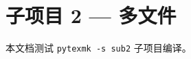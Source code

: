 \documentclass{article}
\begin{document}
\section{子项目 2 — 多文件}

本文档测试 \texttt{pytexmk -s sub2} 子项目编译。




\printnomenclature
\printindex
\end{document}
